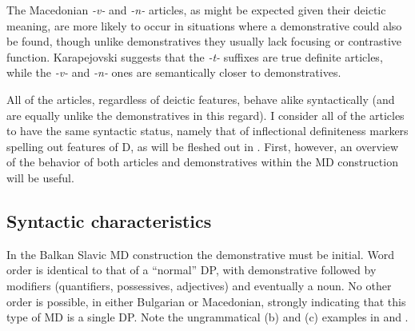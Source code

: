 \documentclass[output=paper,
colorlinks,
citecolor=brown,
newtxmath
]{langscibook}
\begin{document}

\ea \label{exist}
\z
\z

\noindent The Macedonian \textit{-v-} and \textit{-n-} articles, as might be expected given their deictic meaning, are more likely to occur in situations where a demonstrative could also be found, though unlike demonstratives they usually lack focusing or contrastive function. Karapejovski suggests that the \textit{-t-} suffixes are true definite articles, while the \textit{-v-} and \textit{-n-} ones are semantically closer to demonstratives.

All of the articles, regardless of deictic features, behave alike syntactically (and are equally unlike the demonstratives in this regard). I consider all of the articles to have the same syntactic status, namely that of inflectional definiteness markers spelling out features of D, as will be fleshed out in . First, however, an overview of the behavior of both articles and demonstratives within the MD construction will be useful.

\subsection{Syntactic characteristics} \label{syntactic}

In the Balkan Slavic MD construction the demonstrative must be initial. Word order is identical to that of a ``normal'' DP, with demonstrative followed by modifiers (quantifiers, possessives, adjectives) and eventually a noun. No other order is possible, in either Bulgarian or Macedonian, strongly indicating that this type of MD is a single DP. Note the ungrammatical (b) and (c) examples in  and .
\end{document}
